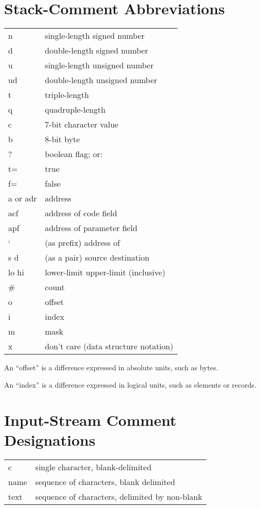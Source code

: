 \section{Stack-Comment Abbreviations}
\begin{longtable}{>{\small}l>{\small}l}
{}{\setlength{\parsep}{0cm}}n&single-length signed number\\
d&double-length signed number\\
u&single-length unsigned number\\
ud&double-length unsigned number\\
t&triple-length\\
q&quadruple-length\\
c&7-bit character value\\
b&8-bit byte\\
?&boolean flag; or:\\
t=&true\\
f=&false\\
a or adr&address\\
acf&address of code field\\
apf&address of parameter field\\
`&(as prefix) address of\\
s d&(as a pair) source destination\\
lo hi&lower-limit upper-limit (inclusive)\\
\#&count\\
o&offset\\
i&index\\
m&mask\\
x&don't care (data structure notation)\\
\end{longtable}


An ``offset'' is a difference expressed in absolute units, such as bytes.

An ``index'' is a difference expressed in logical units, such as
elements or records.

{\section{Input-Stream Comment Designations}
}

\indent\begin{tabular}{ll}
{}{\setlength{\parsep}{0cm}}c&single character, blank-delimited\\
name&sequence of characters, blank delimited\\
text&sequence of characters, delimited by non-blank\\
\end{tabular}\medskip

